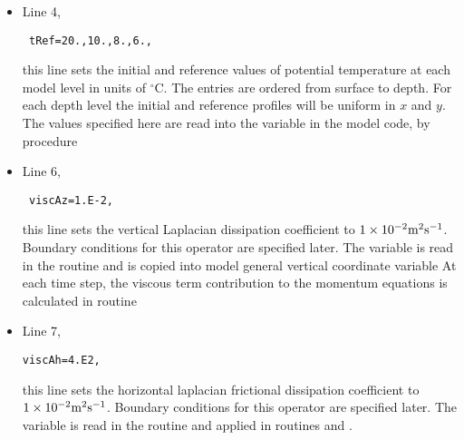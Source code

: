 \begin{itemize}

\item Line 4, 
\begin{verbatim} tRef=20.,10.,8.,6., \end{verbatim} 
this line sets the initial and reference values of potential
temperature at each model level in units of $^{\circ}$C.  The entries
are ordered from surface to depth. For each depth level the initial
and reference profiles will be uniform in $x$ and $y$. The values
specified here are read into the variable  in the
model code, by procedure 


\item Line 6, 
\begin{verbatim} viscAz=1.E-2, \end{verbatim} 
this line sets the vertical Laplacian dissipation coefficient to $1
\times 10^{-2} {\rm m^{2}s^{-1}}$. Boundary conditions for this
operator are specified later.  The variable 
is read in the routine 
and is copied into model general vertical coordinate variable
 At each time step, the viscous term
contribution to the momentum equations is calculated in routine


\item Line 7, 
\begin{verbatim}
viscAh=4.E2,
\end{verbatim} 
  this line sets the horizontal laplacian frictional dissipation
  coefficient to $1 \times 10^{-2} {\rm m^{2}s^{-1}}$. Boundary
  conditions for this operator are specified later.  The variable
   is read in the routine
   and applied in routines
   and
  .



\end{itemize}
